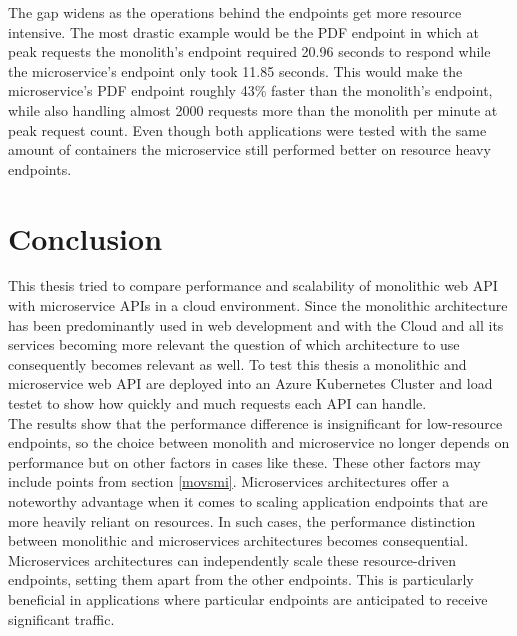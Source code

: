 \documentclass[BIF,Bachelor,nenglish]{twbook}%
\newcommand{\FHTWCitationType}{IEEE} %
\begin{document}
The gap widens as the operations behind the endpoints get more resource intensive. The most drastic example would be the PDF endpoint in which at peak requests the monolith's endpoint required 20.96 seconds to respond while the microservice's endpoint only took 11.85 seconds. This would make the microservice's PDF endpoint roughly 43\% faster than the monolith's endpoint, while also handling almost 2000 requests more than the monolith per minute at peak request count. Even though both applications were tested with the same amount of containers the microservice still performed better on resource heavy endpoints.

\chapter{Conclusion}
This thesis tried to compare performance and scalability of monolithic web \ac{API} with microservice \ac{API}s in a cloud environment. Since the monolithic architecture has been predominantly used in web development and with the Cloud and all its services becoming more relevant the question of which architecture to use consequently becomes relevant as well. To test this thesis a monolithic and microservice web \ac{API} are deployed into an Azure Kubernetes Cluster and load testet to show how quickly and much requests each \ac{API} can handle.
\\
\noindent
The results show that the performance difference is insignificant for low-resource endpoints, so the choice between monolith and microservice no longer depends on performance but on other factors in cases like these. These other factors may include points from section \ref{movsmi}. Microservices architectures offer a noteworthy advantage when it comes to scaling application endpoints that are more heavily reliant on resources. In such cases, the performance distinction between monolithic and microservices architectures becomes consequential. Microservices architectures can independently scale these resource-driven endpoints, setting them apart from the other endpoints. This is particularly beneficial in applications where particular endpoints are anticipated to receive significant traffic.


%
%
\clearpage
\ifthenelse{\equal{\FHTWCitationType}{HARVARD}}{}{}

\clearpage

\listoffigures
\clearpage

\listoftables
\clearpage
\end{document}
